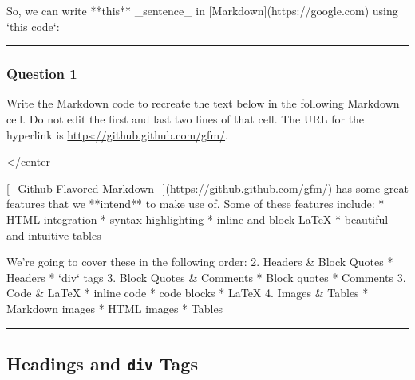 \documentclass[11pt]{article}
\newenvironment{Shaded}{}{}
\newcommand{\BaseNTok}[1]{\textcolor[rgb]{0.25,0.63,0.44}{{#1}}}
\newcommand{\FloatTok}[1]{\textcolor[rgb]{0.25,0.63,0.44}{{#1}}}
\newcommand{\OtherTok}[1]{\textcolor[rgb]{0.00,0.44,0.13}{{#1}}}
\newcommand{\NormalTok}[1]{{#1}}
\begin{document}
\begin{Shaded}
\begin{Highlighting}[]
\NormalTok{So, we can write **this** _sentence_ in }\OtherTok{[Markdown](https://google.com)}\NormalTok{ using }\BaseNTok{`this code`}\NormalTok{:}
\end{Highlighting}
\end{Shaded}

    \begin{center}\rule{0.5\linewidth}{\linethickness}\end{center}

\hypertarget{question-1}{%
\subsubsection{Question 1}\label{question-1}}

Write the Markdown code to recreate the text below in the following
Markdown cell. Do not edit the first and last two lines of that cell.
The URL for the hyperlink is \url{https://github.github.com/gfm/}.

\textless{}/center

    \begin{Shaded}
\begin{Highlighting}[]
\OtherTok{[_Github Flavored Markdown_](https://github.github.com/gfm/)}\NormalTok{ has some great features that we **intend** to make use of. Some of these features include:}
\NormalTok{* }\FloatTok{HTML integration}
\FloatTok{* syntax highlighting}
\FloatTok{* inline and block LaTeX}
\FloatTok{* beautiful and intuitive tables}

\NormalTok{We're going to cover these in the following order:}
\NormalTok{2. }\FloatTok{Headers & Block Quotes}
\FloatTok{    * Headers}
\FloatTok{    * }\BaseNTok{`div`}\FloatTok{ tags}
\FloatTok{3. Block Quotes & Comments}
\FloatTok{    * Block quotes}
\FloatTok{    * Comments}
\FloatTok{3. Code & LaTeX}
\FloatTok{    * inline code}
\FloatTok{    * code blocks}
\FloatTok{    * LaTeX}
\FloatTok{4. Images & Tables}
\FloatTok{    * Markdown images}
\FloatTok{    * HTML images}
\FloatTok{    * Tables}
\end{Highlighting}
\end{Shaded}

\begin{center}\rule{0.5\linewidth}{\linethickness}\end{center}

    \hypertarget{headings}{}

\hypertarget{headings-and-div-tags}{%
\subsection{\texorpdfstring{Headings and \texttt{div}
Tags}{Headings and div Tags}}\label{headings-and-div-tags}}
\end{document}
